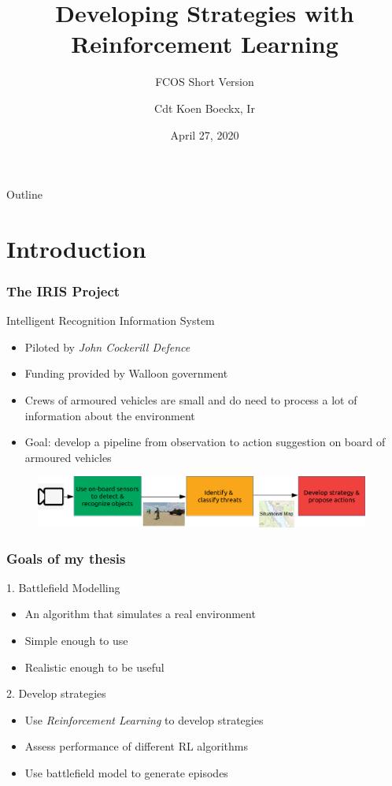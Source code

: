 \documentclass{beamer}
\title{Developing Strategies with Reinforcement Learning}
\subtitle{FCOS Short Version}
\author{Cdt Koen Boeckx, Ir}
\date{April 27, 2020}
\begin{document}

\begin{frame}
\titlepage
\end{frame}

\begin{frame}{Outline}
\tableofcontents
\end{frame}

\section{Introduction}

\begin{frame}
\frametitle{The IRIS Project}
\begin{block}{Intelligent Recognition Information System}
\begin{itemize}
    \item Piloted by \emph{John Cockerill Defence}
    \item Funding provided by Walloon government
    \item Crews of armoured vehicles are small and do need to process a lot of information about the environment
    \item Goal: develop a pipeline from observation to action suggestion on board of armoured vehicles
\end{itemize}
\end{block}
\begin{figure}[htp]
    \centering
    \includegraphics[width=11cm]{images/IRIS_schematic.png}
\end{figure}
\end{frame}

\begin{frame}
\frametitle{Goals of my thesis}
\begin{block}{1. Battlefield Modelling}
\begin{itemize}
    \item An algorithm that simulates a real environment
    \item Simple enough to use
    \item Realistic enough to be useful
\end{itemize}
\end{block}
\pause
\begin{block}{2. Develop strategies}
\begin{itemize}
    \item Use \emph{Reinforcement Learning} to develop strategies
    \item Assess performance of different RL algorithms
    \item Use battlefield model to generate episodes
\end{itemize}
\end{block}
\end{frame}
\end{document}
